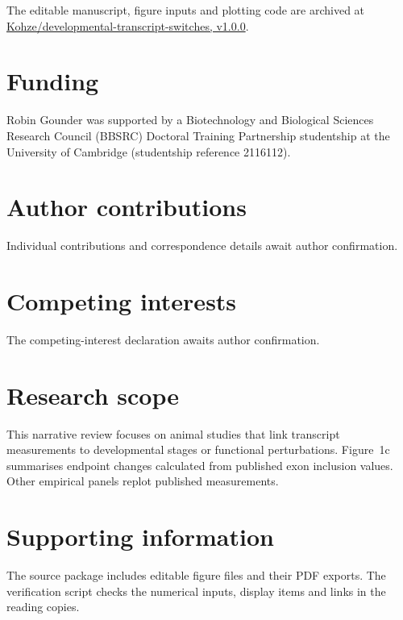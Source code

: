 \documentclass[11pt,a4paper]{article}
\begin{document}
The editable manuscript, figure inputs and plotting code are archived at \href{https://github.com/Kohze/developmental-transcript-switches/tree/v1.0.0}{Kohze/developmental-transcript-switches, v1.0.0}.

\section*{Funding}

Robin Gounder was supported by a Biotechnology and Biological Sciences Research Council (\mbox{BBSRC}) Doctoral Training Partnership studentship at the University of Cambridge (studentship reference 2116112).

\section*{Author contributions}

Individual contributions and correspondence details await author confirmation.

\section*{Competing interests}

The competing-interest declaration awaits author confirmation.

\section*{Research scope}

This narrative review focuses on animal studies that link transcript measurements to developmental stages or functional perturbations. Figure~1c summarises endpoint changes calculated from published exon inclusion values. Other empirical panels replot published measurements.

\section*{Supporting information}

The source package includes editable figure files and their PDF exports. The verification script checks the numerical inputs, display items and links in the reading copies.
\end{document}

